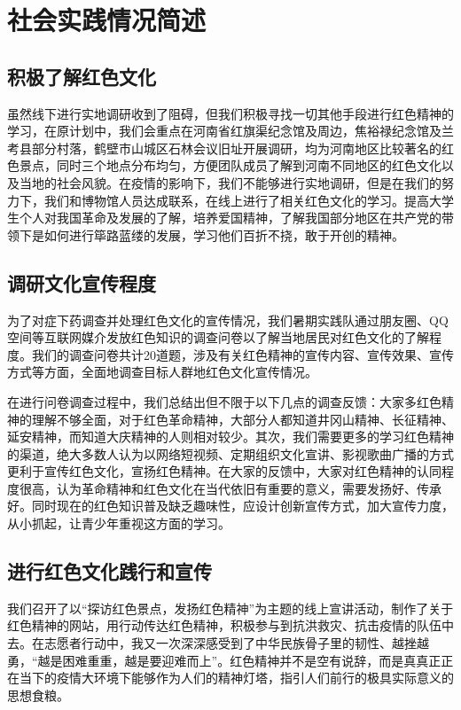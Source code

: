 \documentclass[AutoFakeBold]{LZUThesis}
\begin{document}
\tableofcontents
\thispagestyle{empty}


\mainmatter
\chapter{社会实践情况简述}

\section{积极了解红色文化}
虽然线下进行实地调研收到了阻碍，但我们积极寻找一切其他手段进行红色精神的学习，在原计划中，我们会重点在河南省红旗渠纪念馆及周边，焦裕禄纪念馆及兰考县部分村落，鹤壁市山城区石林会议旧址开展调研，均为河南地区比较著名的红色景点，同时三个地点分布均匀，方便团队成员了解到河南不同地区的红色文化以及当地的社会风貌。在疫情的影响下，我们不能够进行实地调研，但是在我们的努力下，我们和博物馆人员达成联系，在线上进行了相关红色文化的学习。提高大学生个人对我国革命及发展的了解，培养爱国精神，了解我国部分地区在共产党的带领下是如何进行筚路蓝缕的发展，学习他们百折不挠，敢于开创的精神。
\section{调研文化宣传程度}
为了对症下药调查并处理红色文化的宣传情况，我们暑期实践队通过朋友圈、QQ空间等互联网媒介发放红色知识的调查问卷以了解当地居民对红色文化的了解程度。我们的调查问卷共计20道题，涉及有关红色精神的宣传内容、宣传效果、宣传方式等方面，全面地调查目标人群地红色文化宣传情况。

在进行问卷调查过程中，我们总结出但不限于以下几点的调查反馈：大家多红色精神的理解不够全面，对于红色革命精神，大部分人都知道井冈山精神、长征精神、延安精神，而知道大庆精神的人则相对较少。其次，我们需要更多的学习红色精神的渠道，绝大多数人认为以网络短视频、定期组织文化宣讲、影视歌曲广播的方式更利于宣传红色文化，宣扬红色精神。在大家的反馈中，大家对红色精神的认同程度很高，认为革命精神和红色文化在当代依旧有重要的意义，需要发扬好、传承好。同时现在的红色知识普及缺乏趣味性，应设计创新宣传方式，加大宣传力度，从小抓起，让青少年重视这方面的学习。
\section{进行红色文化践行和宣传}
我们召开了以“探访红色景点，发扬红色精神”为主题的线上宣讲活动，制作了关于红色精神的网站，用行动传达红色精神，积极参与到抗洪救灾、抗击疫情的队伍中去。在志愿者行动中，我又一次深深感受到了中华民族骨子里的韧性、越挫越勇，“越是困难重重，越是要迎难而上”。红色精神并不是空有说辞，而是真真正正在当下的疫情大环境下能够作为人们的精神灯塔，指引人们前行的极具实际意义的思想食粮。
\end{document}
